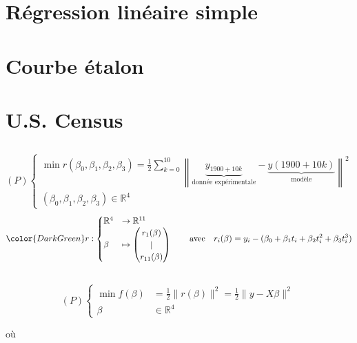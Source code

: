 \documentclass{article}
\newcommand{\R}{\mathbb{R}}
\newcommand{\cor}[1]{{\color{DarkGreen} #1}}
\begin{document}
\section{Régression linéaire simple}

\section{Courbe étalon}

\section{U.S. Census}

\subsection{}

\[
	(P) \begin{cases}
		\min r(\beta_0, \beta_1, \beta_2, \beta_3) = \frac{1}{2} \sum_{k=0}^{10}  \left\| \underbrace{y_{1900+10k}}_{\text{donnée expérimentale}} - \underbrace{y(1900+10k)}_{\text{modèle}}  \right\|^2  \\
		(\beta_0, \beta_1, \beta_2, \beta_3) \in \mathbb{R}^4
	\end{cases}
\] 
\[
	\cor{
	r: \begin{cases}
		\R^{4} &\to \R^{11} \\
		\beta &\mapsto \begin{pmatrix} r_1(\beta) \\ | \\ r_{11}(\beta) \end{pmatrix} 
	\end{cases} \qquad \text{avec} \quad r_i(\beta) = y_i - (\beta_0 + \beta_1 t_i + \beta_2 t_i^2 + \beta_3 t_i^3)
	}
\] 


\subsection{}

\[
	(P) \begin{cases}
		\min f(\beta) &= \frac{1}{2} \|r(\beta)\|^2 = \frac{1}{2} \|y-X\beta\|^2 \\
		\beta &\in \mathbb{R}^4
	\end{cases}
\] 

où
\end{document}
